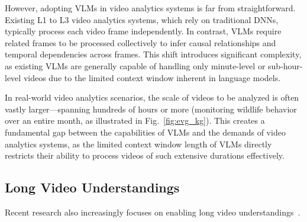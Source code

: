 However, adopting VLMs in video analytics systems is far from straightforward. Existing L1 to L3 video analytics systems, which rely on traditional DNNs, typically process each video frame independently. In contrast, VLMs require related frames to be processed collectively to infer causal relationships and temporal dependencies across frames. This shift introduces significant complexity, as existing VLMs are generally capable of handling only minute-level or sub-hour-level videos due to the limited context window inherent in language models.

In real-world video analytics scenarios, the scale of videos to be analyzed is often vastly larger—spanning hundreds of hours or more (\eg monitoring wildlife behavior over an entire month, as illustrated in Fig.~\ref{fig:evg_kg}). This creates a fundamental gap between the capabilities of VLMs and the demands of video analytics systems, as the limited context window length of VLMs directly restricts their ability to process videos of such extensive durations effectively.


\begin{table}[t]
\centering
{}
\caption{}
\label{tab:few_needed_frames}
\end{table}

\subsection{Long Video Understandings}




Recent research also increasingly focuses on enabling long video understandings~\cite{shen2024longvu, wang2025adaretake}.  


